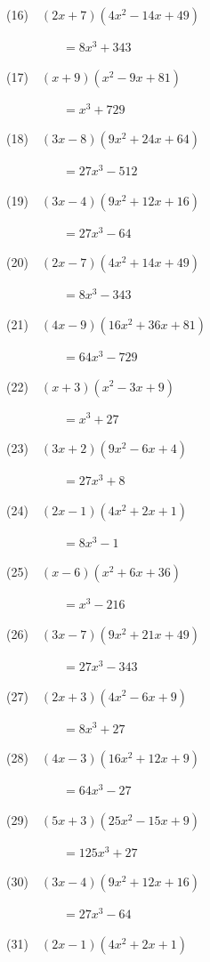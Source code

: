 \documentclass[a4j,twocolumn,10pt,fleqn]{jarticle}
\begin{document}
(16)~~$\left(2 x + 7\right) \left(4 x^{2} - 14 x + 49\right)$

~~~~~~~~~$=8 x^{3} + 343$

(17)~~$\left(x + 9\right) \left(x^{2} - 9 x + 81\right)$

~~~~~~~~~$=x^{3} + 729$

(18)~~$\left(3 x - 8\right) \left(9 x^{2} + 24 x + 64\right)$

~~~~~~~~~$=27 x^{3} - 512$

(19)~~$\left(3 x - 4\right) \left(9 x^{2} + 12 x + 16\right)$

~~~~~~~~~$=27 x^{3} - 64$

(20)~~$\left(2 x - 7\right) \left(4 x^{2} + 14 x + 49\right)$

~~~~~~~~~$=8 x^{3} - 343$

(21)~~$\left(4 x - 9\right) \left(16 x^{2} + 36 x + 81\right)$

~~~~~~~~~$=64 x^{3} - 729$

(22)~~$\left(x + 3\right) \left(x^{2} - 3 x + 9\right)$

~~~~~~~~~$=x^{3} + 27$

(23)~~$\left(3 x + 2\right) \left(9 x^{2} - 6 x + 4\right)$

~~~~~~~~~$=27 x^{3} + 8$

(24)~~$\left(2 x - 1\right) \left(4 x^{2} + 2 x + 1\right)$

~~~~~~~~~$=8 x^{3} - 1$

(25)~~$\left(x - 6\right) \left(x^{2} + 6 x + 36\right)$

~~~~~~~~~$=x^{3} - 216$

(26)~~$\left(3 x - 7\right) \left(9 x^{2} + 21 x + 49\right)$

~~~~~~~~~$=27 x^{3} - 343$

(27)~~$\left(2 x + 3\right) \left(4 x^{2} - 6 x + 9\right)$

~~~~~~~~~$=8 x^{3} + 27$

(28)~~$\left(4 x - 3\right) \left(16 x^{2} + 12 x + 9\right)$

~~~~~~~~~$=64 x^{3} - 27$

(29)~~$\left(5 x + 3\right) \left(25 x^{2} - 15 x + 9\right)$

~~~~~~~~~$=125 x^{3} + 27$

(30)~~$\left(3 x - 4\right) \left(9 x^{2} + 12 x + 16\right)$

~~~~~~~~~$=27 x^{3} - 64$

(31)~~$\left(2 x - 1\right) \left(4 x^{2} + 2 x + 1\right)$
\end{document}
